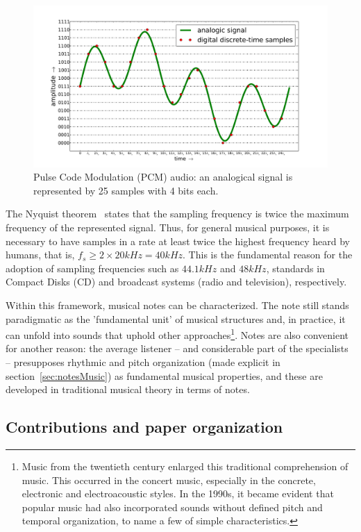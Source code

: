 \begin{figure}
    \centering
        \includegraphics[width=.7\textwidth]{figures/pcm}
        \caption{Pulse Code Modulation (PCM) audio: an analogical signal is represented by 25 samples with 4 bits each.}
        \label{fig:PCM}
\end{figure}

The Nyquist theorem~\cite{Openheim} states that the sampling frequency is twice the maximum frequency of the represented signal. Thus, for general musical purposes, it is necessary to have samples in a rate at least twice the highest frequency heard by humans, that is, $f_s \geq 2\times 20kHz = 40kHz$. This is the fundamental reason for the adoption of sampling frequencies such as $44.1kHz$ and $48kHz$, standards in Compact Disks (CD) and broadcast systems (radio and television), respectively.

Within this framework, musical notes can be characterized. The note still stands paradigmatic as the 'fundamental unit' of musical structures and, in practice, it can unfold into sounds that uphold other approaches\footnote{Music from the twentieth century enlarged this traditional comprehension of music. This occurred in the concert music, especially in the concrete, electronic and electroacoustic styles. In the 1990s, it became evident that popular music had also incorporated sounds without defined pitch and temporal organization, to name a few of simple characteristics.}. 
    Notes are also convenient for another reason: the average listener -- and considerable part of the specialists -- presupposes rhythmic and pitch organization (made explicit in section~\ref{sec:notesMusic}) as fundamental musical properties, and these are developed in traditional musical theory in terms of notes.

\subsection{Contributions and paper organization}

